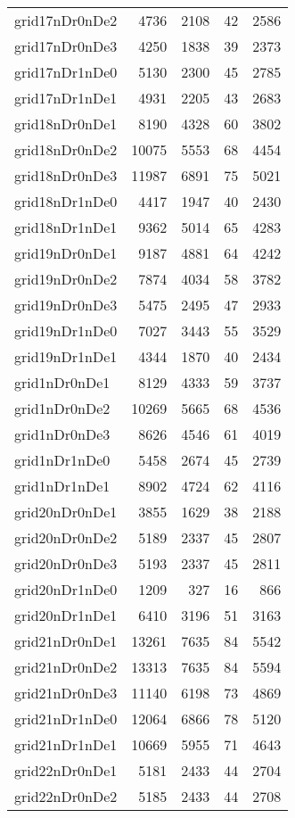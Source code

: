 \begin{longtable}{lrrrr}
grid17nDr0nDe2 & 4736 & 2108 & 42 & 2586 \\
grid17nDr0nDe3 & 4250 & 1838 & 39 & 2373 \\
grid17nDr1nDe0 & 5130 & 2300 & 45 & 2785 \\
grid17nDr1nDe1 & 4931 & 2205 & 43 & 2683 \\
grid18nDr0nDe1 & 8190 & 4328 & 60 & 3802 \\
grid18nDr0nDe2 & 10075 & 5553 & 68 & 4454 \\
grid18nDr0nDe3 & 11987 & 6891 & 75 & 5021 \\
grid18nDr1nDe0 & 4417 & 1947 & 40 & 2430 \\
grid18nDr1nDe1 & 9362 & 5014 & 65 & 4283 \\
grid19nDr0nDe1 & 9187 & 4881 & 64 & 4242 \\
grid19nDr0nDe2 & 7874 & 4034 & 58 & 3782 \\
grid19nDr0nDe3 & 5475 & 2495 & 47 & 2933 \\
grid19nDr1nDe0 & 7027 & 3443 & 55 & 3529 \\
grid19nDr1nDe1 & 4344 & 1870 & 40 & 2434 \\
grid1nDr0nDe1 & 8129 & 4333 & 59 & 3737 \\
grid1nDr0nDe2 & 10269 & 5665 & 68 & 4536 \\
grid1nDr0nDe3 & 8626 & 4546 & 61 & 4019 \\
grid1nDr1nDe0 & 5458 & 2674 & 45 & 2739 \\
grid1nDr1nDe1 & 8902 & 4724 & 62 & 4116 \\
grid20nDr0nDe1 & 3855 & 1629 & 38 & 2188 \\
grid20nDr0nDe2 & 5189 & 2337 & 45 & 2807 \\
grid20nDr0nDe3 & 5193 & 2337 & 45 & 2811 \\
grid20nDr1nDe0 & 1209 & 327 & 16 & 866 \\
grid20nDr1nDe1 & 6410 & 3196 & 51 & 3163 \\
grid21nDr0nDe1 & 13261 & 7635 & 84 & 5542 \\
grid21nDr0nDe2 & 13313 & 7635 & 84 & 5594 \\
grid21nDr0nDe3 & 11140 & 6198 & 73 & 4869 \\
grid21nDr1nDe0 & 12064 & 6866 & 78 & 5120 \\
grid21nDr1nDe1 & 10669 & 5955 & 71 & 4643 \\
grid22nDr0nDe1 & 5181 & 2433 & 44 & 2704 \\
grid22nDr0nDe2 & 5185 & 2433 & 44 & 2708 \\

\end{longtable}

